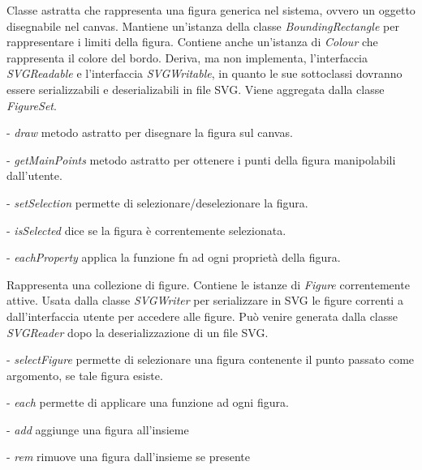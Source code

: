 Classe astratta che rappresenta una figura generica nel sistema, ovvero un oggetto disegnabile nel canvas.
Mantiene un'istanza della classe \textit{BoundingRectangle} per rappresentare i limiti della figura. Contiene anche un'istanza di \textit{Colour} che rappresenta il colore del bordo. Deriva, ma non implementa, l'interfaccia \textit{SVGReadable} e l'interfaccia \textit{SVGWritable}, in quanto le sue sottoclassi dovranno essere serializzabili e deserializabili in file SVG.
Viene aggregata dalla classe \textit{FigureSet}.
\begin{elencopuntato}[\normindent]
\item[-]  \textit{draw} metodo astratto per disegnare la figura sul canvas.
\item[-]  \textit{getMainPoints} metodo astratto per ottenere i punti della figura manipolabili dall'utente.
\item[-]  \textit{setSelection} permette di selezionare/deselezionare la figura.
\item[-]  \textit{isSelected} dice se la figura \`e correntemente selezionata.
\item[-]  \textit{eachProperty} applica la funzione fn ad ogni propriet\`a della figura.
\end{elencopuntato}

Rappresenta una collezione di figure.
Contiene le istanze di \textit{Figure} correntemente attive.
Usata dalla classe \textit{SVGWriter} per serializzare in SVG le figure correnti a dall'interfaccia utente per accedere alle figure. Pu\`o venire generata dalla classe \textit{SVGReader} dopo la deserializzazione di un file SVG.
\begin{elencopuntato}[\normindent]
\item[-]  \textit{selectFigure} permette di selezionare una figura contenente il punto passato come argomento, se tale figura esiste.
\item[-]  \textit{each} permette di applicare una funzione ad ogni figura.
\item[-]  \textit{add} aggiunge una figura all'insieme
\item[-]  \textit{rem} rimuove una figura dall'insieme se presente
\end{elencopuntato}

